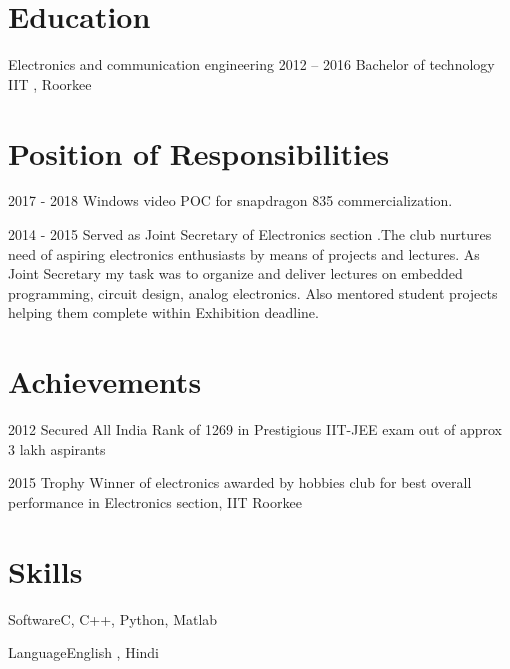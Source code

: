 \documentclass{tccv}
\begin{document}
\section{Education}

\begin{yearlist}

\item[Electronics and communication engineering]{2012 -- 2016}
     {Bachelor of technology}
     {IIT , Roorkee}

\end{yearlist}

\section{Position of Responsibilities}

\begin{yearlist}

\item{2017 - 2018}
     {Windows video POC for snapdragon 835 commercialization.}

\item{2014 - 2015}
     {Served as Joint Secretary of Electronics section .The club nurtures need of aspiring electronics enthusiasts by means of projects and lectures. As Joint Secretary my task was to organize and deliver lectures on embedded programming, circuit design, analog electronics. Also mentored student projects helping them complete within Exhibition deadline.}

\end{yearlist}
\section{Achievements}

\begin{yearlist}

\item{2012}
     {Secured All India Rank of 1269 in Prestigious IIT-JEE exam out of approx 3 lakh aspirants }
     
\item{2015}
     {Trophy Winner of electronics awarded by hobbies club for best overall performance in Electronics section, IIT Roorkee}

\end{yearlist}

\section{Skills}

\begin{factlist}
\item{Software}{C, C++, Python, Matlab}
\item{Language}{English , Hindi}
\end{factlist}
\end{document}
